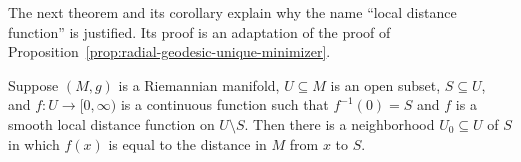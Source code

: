 The next theorem and its corollary explain why the name ``local distance function'' is justified. Its proof is an adaptation of the proof of Proposition~\ref{prop:radial-geodesic-unique-minimizer}.


\begin{theorem}
\label{thm:smooth-local-distance-function}

Suppose $(M, g)$ is a Riemannian manifold, $U \subseteq M$ is an open subset, $S \subseteq U$, and $f: U \to [0,\infty)$ is a continuous function such that $f^{-1}(0) = S$ and $f$ is a smooth local distance function on $U \setminus S$. Then there is a neighborhood $U_0 \subseteq U$ of $S$ in which $f(x)$ is equal to the distance in $M$ from $x$ to $S$.
\end{theorem}

